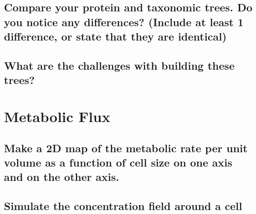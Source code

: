 \documentclass[]{article}
\begin{document}
\subsection{ Compare your protein and
	taxonomic trees. Do you notice
	any differences? (Include at
	least 1 difference, or state that
	they are identical)}

\subsection{ What are the challenges with
	building these trees?}

\section{Metabolic Flux}

\subsection{Make a 2D map of the metabolic rate per unit volume as
	a function of cell size on one axis and on the other
	axis.}

\subsection{Simulate the concentration field around a cell}

\printglossaries




\end{document}
